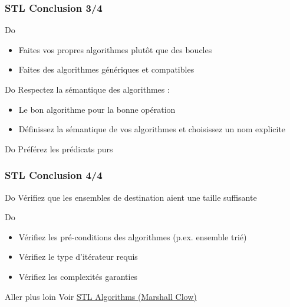 \documentclass[C++.tex]{subfiles}
\begin{document}
\begin{frame}
	\frametitle{STL Conclusion \titlehfill{}3/4}
	\begin{exampleblock}{Do}
		\begin{itemize}
			\item Faites vos propres algorithmes plutôt que des boucles
			\item Faites des algorithmes génériques et compatibles
		\end{itemize}
	\end{exampleblock}

	\begin{exampleblock}{Do}
		Respectez la sémantique des algorithmes :
		\begin{itemize}
			\item Le bon algorithme pour la bonne opération
			\item Définissez la sémantique de vos algorithmes et choisissez un nom explicite
		\end{itemize}
	\end{exampleblock}

	\begin{exampleblock}{Do}
		Préférez les prédicats \og purs\fg{}
	\end{exampleblock}
\end{frame}

\begin{frame}
	\frametitle{STL Conclusion \titlehfill{}4/4}
	\begin{exampleblock}{Do}
		Vérifiez que les ensembles de destination aient une taille suffisante
	\end{exampleblock}

	\begin{exampleblock}{Do}
		\begin{itemize}
			\item Vérifiez les pré-conditions des algorithmes (p.ex. ensemble trié)
			\item Vérifiez le type d'itérateur requis
			\item Vérifiez les complexités garanties
		\end{itemize}
	\end{exampleblock}

	\begin{block}{Aller plus loin}
		Voir \href{https://github.com/CppCon/CppCon2016/blob/master/Presentations/STL\%20Algorithms/STL\%20Algorithms\%20-\%20Marshall\%20Clow\%20-\%20CppCon\%202016.pdf}{STL Algorithms (Marshall Clow)}

	\end{block}
\end{frame}
\end{document}
